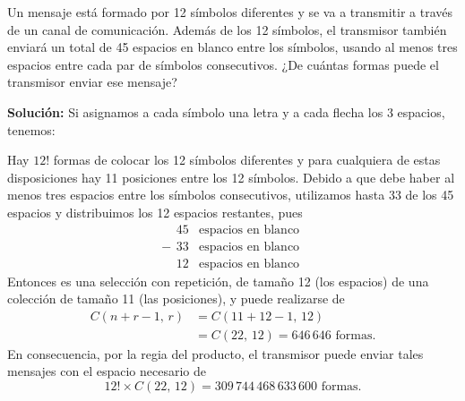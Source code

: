 \newpage

\begin{myexample}
    Un mensaje está formado por 12 símbolos diferentes y se va a transmitir a través de un canal de comunicación. Además de los 12 símbolos, el transmisor también enviará un total de 45 espacios en blanco entre los símbolos, usando al menos tres espacios entre cada par de símbolos consecutivos. ¿De cuántas formas puede el transmisor enviar ese mensaje?

    \tcblower
    \textbf{\color{jblueleft}Solución:} Si asignamos a cada símbolo una letra y a cada flecha los 3 espacios, tenemos:
    \begin{center}
    \end{center}
    Hay $12!$ formas de colocar los 12 símbolos diferentes y para cualquiera de estas disposiciones hay 11 posiciones entre los 12 símbolos. Debido a que debe haber al menos tres espacios entre los símbolos consecutivos, utilizamos hasta 33 de los 45 espacios y distribuimos los 12 espacios restantes, pues
    $$- \begin{array}{rl}
        45 & \text{espacios en blanco} \\
        33 & \text{espacios en blanco} \\
        \hline
        12 & \text{espacios en blanco}
    \end{array}$$
    Entonces es una selección con repetición, de tamaño 12 (los espacios) de una colección de tamaño 11 (las posiciones), y puede realizarse de
    \begin{align*}
        C(n + r - 1, \, r) & = C(11 + 12 - 1, \, 12) \\
        & = C(22, \, 12) = 646 \, 646 \text{ formas.}
    \end{align*}
    En consecuencia, por la regia del producto, el transmisor puede enviar tales mensajes con el espacio necesario de
    $$12! \times C(22, \, 12) = 309 \, 744 \, 468 \, 633 \, 600 \text{ formas.}$$
\end{myexample}

